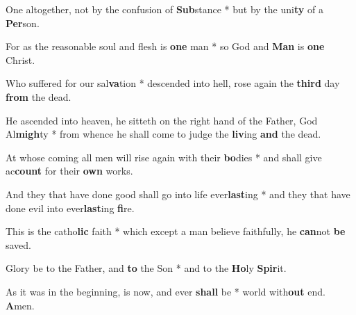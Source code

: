 \begin{multicols}{2}
	One altogether, not by the confusion of \textbf{Sub}stance * but by the uni\textbf{ty} of a \textbf{Per}son.
	
	For as the reasonable soul and flesh is \textbf{one} man * so God and \textbf{Man} is \textbf{one} Christ.
	
	Who suffered for our sal\textbf{va}tion * descended into hell, rose again the \textbf{third} day \textbf{from} the dead.
	
	He ascended into heaven, he sitteth on the right hand of the Father, God Al\textbf{migh}ty * from whence he shall come to judge the \textbf{liv}ing \textbf{and} the dead.
	
	At whose coming all men will rise again with their \textbf{bo}dies * and shall give ac\textbf{count} for their \textbf{own} works.
	
	And they that have done good shall go into life ever\textbf{last}ing * and they that have done evil into ever\textbf{last}ing \textbf{fi}re.
	
	This is the catho\textbf{lic} faith * which except a man believe faithfully, he \textbf{can}not \textbf{be} saved.
	
	Glory be to the Father, and \textbf{to} the Son * and to the \textbf{Ho}ly \textbf{Spir}it.
	
	As it was in the beginning, is now, and ever \textbf{shall} be * world with\textbf{out} end. \textbf{A}men.
\end{multicols}